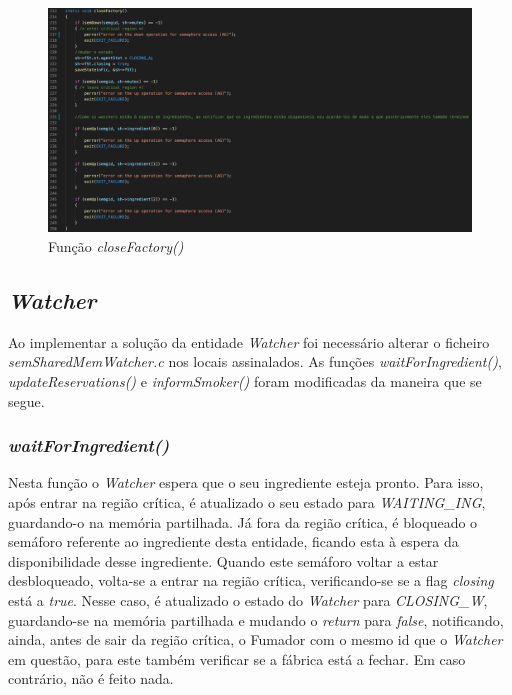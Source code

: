 \documentclass[10pt,portuguese]{article}
\begin{document}
\begin{figure}[!h]
    \centering
    \includegraphics[width=\textwidth]{images/implementation/closefact.png}
    \caption{Função \textit{closeFactory()}}
\end{figure}

\subsection{\textit{Watcher}}
\par Ao implementar a solução da entidade \textit{Watcher} foi necessário alterar o ficheiro \textit{semSharedMemWatcher.c} nos locais assinalados. As funções \textit{waitForIngredient()}, \textit{updateReservations()} e \textit{informSmoker()} foram modificadas da maneira que se segue.

\subsubsection{\textit{waitForIngredient()}}

\par Nesta função o \textit{Watcher} espera que o seu ingrediente esteja pronto. Para isso, após entrar na região crítica, é atualizado o seu estado para \textit{WAITING\_ING}, guardando-o na memória partilhada. Já fora da região crítica, é bloqueado o semáforo referente ao ingrediente desta entidade, ficando esta à espera da disponibilidade desse ingrediente. Quando este semáforo voltar a estar desbloqueado, volta-se a entrar na região crítica, verificando-se se a flag \textit{closing} está a \textit{true}. Nesse caso, é atualizado o estado do \textit{Watcher} para \textit{CLOSING\_W}, guardando-se na memória partilhada e mudando o \textit{return} para \textit{false}, notificando, ainda, antes de sair da região crítica, o Fumador com o mesmo id que o \textit{Watcher} em questão, para este também verificar se a fábrica está a fechar. Em caso contrário, não é feito nada.
\end{document}
